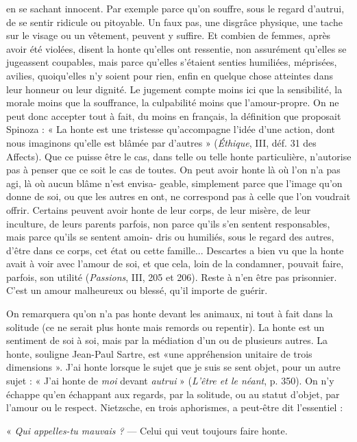 en se sachant innocent. Par exemple parce qu’on souffre, sous le
regard d’autrui, de se sentir ridicule ou pitoyable. Un faux pas, une disgrâce
physique, une tache sur le visage ou un vêtement, peuvent y suffire. Et combien
de femmes, après avoir été violées, disent la honte qu’elles ont ressentie,
non assurément qu’elles se jugeassent coupables, mais parce qu’elles s'étaient
senties humiliées, méprisées, avilies, quoiqu’elles n’y soient pour rien, enfin en
quelque chose atteintes dans leur honneur ou leur dignité. Le jugement compte
moins ici que la sensibilité, la morale moins que la souffrance, la culpabilité
moins que l’amour-propre. On ne peut donc accepter tout à fait, du moins en
français, la définition que proposait Spinoza : « La honte est une tristesse
qu’accompagne l’idée d’une action, dont nous imaginons qu’elle est blâmée par
d’autres » ({\it Éthique}, III, déf. 31 des Affects). Que ce puisse être le cas, dans telle
ou telle honte particulière, n'autorise pas à penser que ce soit le cas de toutes.
On peut avoir honte là où l’on n’a pas agi, là où aucun blâme n’est envisa-
geable, simplement parce que l’image qu’on donne de soi, ou que les autres en
ont, ne correspond pas à celle que l’on voudrait offrir. Certains peuvent avoir
honte de leur corps, de leur misère, de leur inculture, de leurs parents parfois,
non parce qu'ils s’en sentent responsables, mais parce qu’ils se sentent amoin-
dris ou humiliés, sous le regard des autres, d’être dans ce corps, cet état ou cette
famille... Descartes a bien vu que la honte avait à voir avec l’amour de soi, et
que cela, loin de la condamner, pouvait faire, parfois, son utilité ({\it Passions}, III,
205 et 206). Reste à n’en être pas prisonnier. C’est un amour malheureux ou
blessé, qu’il importe de guérir.

On remarquera qu’on n’a pas honte devant les animaux, ni tout à fait dans
la solitude (ce ne serait plus honte mais remords ou repentir). La honte est un
sentiment de soi à soi, mais par la médiation d’un ou de plusieurs autres. La
honte, souligne Jean-Paul Sartre, est «une appréhension unitaire de trois
dimensions ». J'ai honte lorsque le sujet que je suis se sent objet, pour un autre
sujet : « J'ai honte de {\it moi} devant {\it autrui} » ({\it L'être et le néant}, p. 350). On n’y
échappe qu’en échappant aux regards, par la solitude, ou au statut d’objet, par
l’amour ou le respect. Nietzsche, en trois aphorismes, a peut-être dit l'essentiel :

« {\it Qui appelles-tu mauvais ?} — Celui qui veut toujours faire honte.

